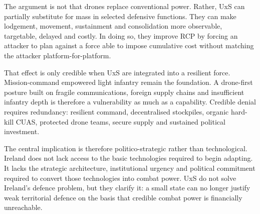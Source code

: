 The argument is not that drones replace conventional power. Rather, UxS can partially substitute for mass in selected defensive functions. They can make lodgement, movement, sustainment and consolidation more observable, targetable, delayed and costly. In doing so, they improve RCP by forcing an attacker to plan against a force able to impose cumulative cost without matching the attacker platform-for-platform.

That effect is only credible when UxS are integrated into a resilient force. Mission-command empowered light infantry remain the foundation. A drone-first posture built on fragile communications, foreign supply chains and insufficient infantry depth is therefore a vulnerability as much as a capability. Credible denial requires redundancy: resilient command, decentralised stockpiles, organic hard-kill CUAS, protected drone teams, secure supply and sustained political investment.

The central implication is therefore politico-strategic rather than technological. Ireland does not lack access to the basic technologies required to begin adapting. It lacks the strategic architecture, institutional urgency and political commitment required to convert those technologies into combat power. UxS do not solve Ireland’s defence problem, but they clarify it: a small state can no longer justify weak territorial defence on the basis that credible combat power is financially unreachable.

